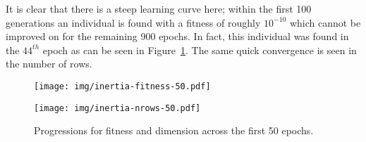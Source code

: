 It is clear that there is a steep learning curve here; within the first 100
generations an individual is found with a fitness of roughly \(10^{-10}\) which
cannot be improved on for the remaining 900 epochs. In fact, this individual was
found in the \(44^{th}\) epoch as can be seen in
Figure~\ref{figure:inertia-50}. The same quick convergence is seen in the number
of rows.

\begin{figure}[htbp]
    \centering
    \begin{minipage}{\imgwidth}
        \centering
        \texttt{[image: img/inertia-fitness-50.pdf]}
    \end{minipage}

    \begin{minipage}{\imgwidth}
        \centering
        \texttt{[image: img/inertia-nrows-50.pdf]}
    \end{minipage}
    \caption{Progressions for fitness and dimension across the first 50
             epochs.}\label{figure:inertia-50}
\end{figure}

